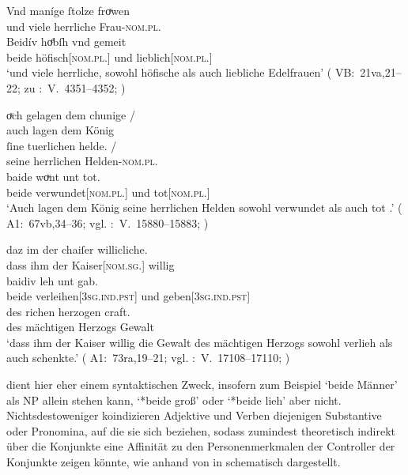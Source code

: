 \largerpage %
\begin{exe}
\ex \begin{xlist}
	\ex\label{ex:konjattradj}
		\gll Vnd maníge ſtolze froͮwen \\
			und viele herrliche Frau-\textsc{nom.pl.\FemF} \\%
	\sn \gll Beidív hoͤbſh vnd gemeit \\
			beide höfisch[\textsc{nom.pl.\FemF}] und lieblich[\textsc{nom.pl.\FemF}] \\
		\trans `und viele herrliche, sowohl höfische als auch liebliche Edelfrauen'
			(%
				VB:~21va,21--22; zu
				\KC:~V.~4351--4352;
				\cite[161]{schroeder1895}%
			)

	\ex \label{ex:konjcopredadj}
		\gll oͮch gelagen dem chunige {/} \\
			auch lagen dem König \\
		\gll ſine tuerlichen helde. {/} \\
			seine herrlichen Helden-\textsc{nom.pl.\MascM} \\
		\gll baide woͮnt unt tot. \\
			beide verwundet[\textsc{nom.pl.\MascM}] und tot[\textsc{nom.pl.\MascM}] \\
		\trans `Auch lagen dem König seine herrlichen Helden sowohl verwundet als auch tot .'
			(%
				A1:~67vb,34--36; vgl.
				\KC:~V.~15880--15883;
				\cite[368]{schroeder1895}%
			)

	\ex \label{ex:konjvb}
		\gll daz im der chaiſer willicliche. \\
			dass ihm der Kaiser[\textsc{nom.sg.\MascM}] willig \\
	\sn \gll baidiv leh unt gab. \\
			beide verleihen[\textsc{3sg\subM.ind.pst}] und
			geben[\textsc{3sg\subM.ind.pst}] \\
	\sn \gll des richen herzogen craft. \\
			des mächtigen Herzogs Gewalt \\
		\trans `dass ihm der Kaiser willig die Gewalt des mächtigen Herzogs sowohl verlieh als auch schenkte.'
			(%
				A1:~73ra,19--21; vgl.
				\KC:~V.~17108--17110;
				\cite[389]{schroeder1895}%
			)
	\end{xlist}
\end{exe}

 dient hier eher einem syntaktischen Zweck, insofern zum
Beispiel  `beide Männer' als NP allein stehen
kann,  `*beide groß' oder  `*beide lieh'
aber nicht. Nichtsdestoweniger koindizieren
Adjektive und Verben diejenigen
Substantive oder Pronomina, auf die sie sich beziehen, sodass
 zumindest theoretisch indirekt über die Konjunkte eine Affinität
zu den Personenmerkmalen der Controller der Konjunkte
zeigen könnte, wie anhand von  in
 schematisch dargestellt.

